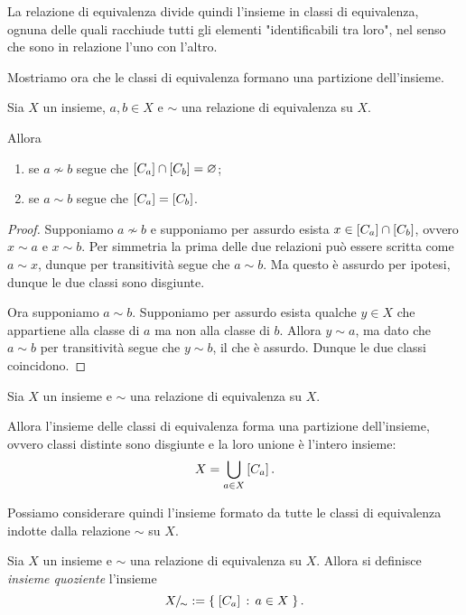 La relazione di equivalenza divide quindi l'insieme in classi di equivalenza, ognuna delle quali racchiude tutti gli elementi "identificabili tra loro", nel senso che sono in relazione l'uno con l'altro.

Mostriamo ora che le classi di equivalenza formano una partizione dell'insieme.

\begin{lemma}
    Sia $X$ un insieme, $a, b \in X$ e $\sim$ una relazione di equivalenza su $X$.

    Allora \begin{enumerate}
        \item se $a \nsim b$ segue che $\eqclass*{a} \inters \eqclass*{b} = \varnothing$;
        \item se $a \sim b$ segue che $\eqclass*{a} = \eqclass*{b}$.
    \end{enumerate}
\end{lemma}
\begin{proof}
    Supponiamo $a \nsim b$ e supponiamo per assurdo esista $x \in \eqclass*{a} \inters \eqclass*{b}$, ovvero $x \sim a$ e $x \sim b$. Per simmetria la prima delle due relazioni può essere scritta come $a \sim x$, dunque per transitività segue che $a \sim b$. Ma questo è assurdo per ipotesi, dunque le due classi sono disgiunte.

    Ora supponiamo $a \sim b$. Supponiamo per assurdo esista qualche $y \in X$ che appartiene alla classe di $a$ ma non alla classe di $b$. Allora $y \sim a$, ma dato che $a \sim b$ per transitività segue che $y \sim b$, il che è assurdo. Dunque le due classi coincidono.
\end{proof}

\begin{theorem}
    Sia $X$ un insieme e $\sim$ una relazione di equivalenza su $X$.

    Allora l'insieme delle classi di equivalenza forma una partizione dell'insieme, ovvero classi distinte sono disgiunte e la loro unione è l'intero insieme: \[
        X = \bigunion_{a \in X} \eqclass*{a}.    
    \]
\end{theorem}

Possiamo considerare quindi l'insieme formato da tutte le classi di equivalenza indotte dalla relazione $\sim$ su $X$.

\begin{definition}
    Sia $X$ un insieme e $\sim$ una relazione di equivalenza su $X$. Allora si definisce \emph{insieme quoziente} l'insieme \begin{equation}
        X/_{\!\sim} \deq \set{\eqclass*{a} \suchthat a \in X}.
    \end{equation}
\end{definition}

